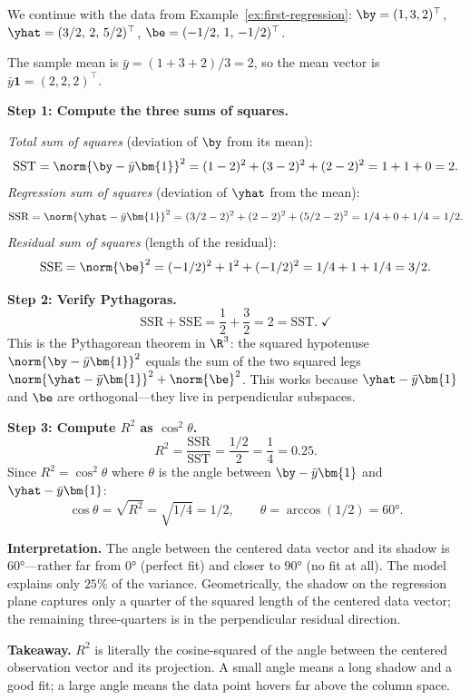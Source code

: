 \begin{example}\label{ex:pythagoras}
We continue with the data from Example~\ref{ex:first-regression}:
$\by = (1,3,2)^\top$, $\yhat = (3/2,\, 2,\, 5/2)^\top$,
$\be = (-1/2,\, 1,\, -1/2)^\top$.

The sample mean is $\bar{y} = (1+3+2)/3 = 2$, so the mean vector is
$\bar{y}\bm{1} = (2, 2, 2)^\top$.

\medskip\noindent\textbf{Step 1: Compute the three sums of squares.}

\emph{Total sum of squares} (deviation of $\by$ from its mean):
\[
\text{SST} = \norm{\by - \bar{y}\bm{1}}^2
= (1-2)^2 + (3-2)^2 + (2-2)^2
= 1 + 1 + 0 = 2.
\]
\emph{Regression sum of squares} (deviation of $\yhat$ from the mean):
\[
\text{SSR} = \norm{\yhat - \bar{y}\bm{1}}^2
= (3/2-2)^2 + (2-2)^2 + (5/2-2)^2
= 1/4 + 0 + 1/4 = 1/2.
\]
\emph{Residual sum of squares} (length of the residual):
\[
\text{SSE} = \norm{\be}^2
= (-1/2)^2 + 1^2 + (-1/2)^2
= 1/4 + 1 + 1/4 = 3/2.
\]

\medskip\noindent\textbf{Step 2: Verify Pythagoras.}
\[
\text{SSR} + \text{SSE} = \frac{1}{2} + \frac{3}{2} = 2 = \text{SST}.\;\checkmark
\]
This is the Pythagorean theorem in $\R^3$:
the squared hypotenuse $\norm{\by - \bar{y}\bm{1}}^2$ equals the sum of the two squared legs
$\norm{\yhat - \bar{y}\bm{1}}^2 + \norm{\be}^2$.
This works because $\yhat - \bar{y}\bm{1}$ and $\be$ are orthogonal---they live in perpendicular subspaces.

\medskip\noindent\textbf{Step 3: Compute $R^2$ as $\cos^2\theta$.}
\[
R^2 = \frac{\text{SSR}}{\text{SST}} = \frac{1/2}{2} = \frac{1}{4} = 0.25.
\]
Since $R^2 = \cos^2\theta$ where $\theta$ is the angle between
$\by - \bar{y}\bm{1}$ and $\yhat - \bar{y}\bm{1}$:
\[
\cos\theta = \sqrt{R^2} = \sqrt{1/4} = 1/2,
\qquad
\theta = \arccos(1/2) = 60°.
\]

\medskip\noindent\textbf{Interpretation.}
The angle between the centered data vector and its shadow
is $60°$---rather far from $0°$ (perfect fit) and closer to $90°$ (no fit at all).
The model explains only $25\%$ of the variance.
Geometrically, the shadow on the regression plane captures only
a quarter of the squared length of the centered data vector;
the remaining three-quarters is in the perpendicular residual direction.

\medskip\noindent\textbf{Takeaway.}
$R^2$ is literally the cosine-squared of the angle between the centered
observation vector and its projection.
A small angle means a long shadow and a good fit;
a large angle means the data point hovers far above the column space.
\end{example}


